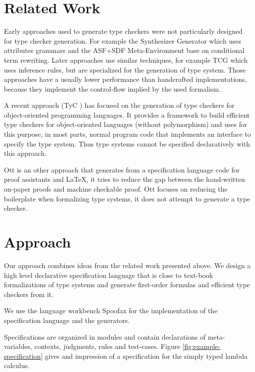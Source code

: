 \documentclass[preprint]{sigplanconf}
\begin{document}
\section{Related Work}
Early approaches used to generate type checkers were not particularly
designed for type checker generation. For example the Synthesizer
Generator \cite{Reps:1984:SG:800020.808247} which uses attributes
grammars and the ASF+SDF Meta-Environment
\cite{vandenBrand:2001:AMC:647477.727788} base on conditional term
rewriting. Later approaches use similar techniques, for example TCG
\cite{phd/de/Gast2005} which uses inference rules, but are specialized
for the generation of type system. Those approaches have a usually
lower performance than handcrafted implementations, because they
implement the control-flow implied by the used formalism.

A recent approach (TyC \cite{ortin2014automatic}) has focused on the
generation of type checkers for object-oriented programming
languages. It provides a framework to build efficient type checkers
for object-oriented languages (without polymorphism) and uses for this
purpose, in most parts, normal program code that implements an
interface to specify the type system. Thus type systems cannot be
specified declaratively with this approach.

Ott \cite{journals/jfp/SewellNOPRSS10} is an other approach that
generates from a specification language code for proof assistants and
\LaTeX, it tries to reduce the gap between the hand-written on-paper
proofs and machine checkable proof. Ott focuses on reducing the
boilerplate when formalizing type systems, it does not attempt to
generate a type checker.
\section{Approach}
Our approach combines ideas from the related work presented above. We
design a high level declarative specification language that is close
to text-book formalizations of type systems and generate first-order
formulas and efficient type checkers from it.

We use the language workbench Spoofax \cite{KatsVisser2010} for the
implementation of the specification language and the generators. 

Specifications are organized in modules and contain declarations of
meta-variables, contexts, judgments, rules and test-cases. Figure
\ref{fig:example-specification} gives and impression of a
specification for the simply typed lambda calculus.
\end{document}
